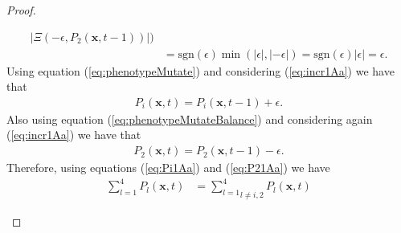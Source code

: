 \documentclass[\main/thesis.tex]{subfiles}
\begin{document}
\begin{proof}
\begin{itemize}
\begin{itemize}
\begin{itemize}
\begin{align*}
                           	                                |\Xi({-}\epsilon,
                           	                                 P_2(\boldsymbol{x}, t{-}1))|)\\
                           	                          &{=} \text{sgn}(\epsilon) 
                           	                                \min(|\epsilon|,
                           	                                     |{-}\epsilon|)
                           	                          {=} \text{sgn}(\epsilon) 
                           	                               |\epsilon| {=} \epsilon.
                           	                          \tag{1}
                           	                          \label{eq:incr1Aa}
                           	                        \end{align*}
                           	                        Using equation (\ref{eq:phenotypeMutate}) and considering 
                           	                        (\ref{eq:incr1Aa}) we have that
                           	                        \begin{align*}
                           	                          P_i(\boldsymbol{x}, t) {=} P_i(\boldsymbol{x}, t{-}1) {+} \epsilon.
                           	                          \tag{2}
                           	                          \label{eq:Pi1Aa}
                           	                        \end{align*}
                           	                        Also using equation (\ref{eq:phenotypeMutateBalance}) and considering 
                           	                        again (\ref{eq:incr1Aa}) we have that
                           	                        \begin{align*}
                           	                          P_2(\boldsymbol{x}, t) {=} P_2(\boldsymbol{x}, t{-}1) {-} \epsilon.
                           	                          \tag{3}
                           	                          \label{eq:P21Aa}
                           	                        \end{align*}
                           	                        Therefore, using equations (\ref{eq:Pi1Aa}) and (\ref{eq:P21Aa}) we have 
                           	                        \begin{align*}
                           	                          \sum_{l{=}1}^4 P_l(\boldsymbol{x}, t) 
                           	                          &{=} \underset{l {\ne} i, 2}{\sum_{l{=}1}^4} P_l(\boldsymbol{x}, t)

\end{align*}
\end{itemize}
\end{itemize}
\end{itemize}
\end{proof}
\end{document}
